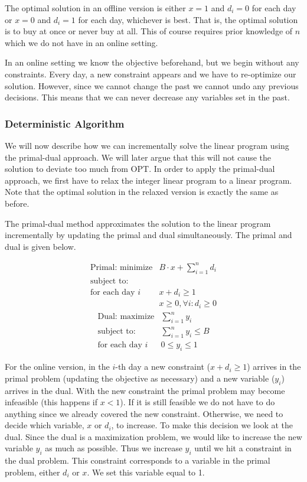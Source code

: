 The optimal solution in an offline version is either $x=1$ and $d_i = 0$ for each day or $x=0$ and $d_i = 1$ for each day, whichever is best.
That is, the optimal solution is to buy at once or never buy at all.
This of course requires prior knowledge of $n$ which we do not have in an online setting.

In an online setting we know the objective beforehand, but we begin without any constraints.
Every day, a new constraint appears and we have to re-optimize our solution.
However, since we cannot change the past we cannot undo any previous decisions.
This means that we can never decrease any variables set in the past.

\subsubsection{Deterministic Algorithm}

We will now describe how we can incrementally solve the linear program using the primal-dual approach.
We will later argue that this will not cause the solution to deviate too much from OPT.
In order to apply the primal-dual approach, we first have to relax the integer linear program to a linear program. Note that the optimal solution in the relaxed version is exactly the same as before.

The primal-dual method approximates the solution to the linear program incrementally by updating the primal and dual simultaneously.
The primal and dual is given below.

\[
	\begin{array}{lr}
	\textrm{Primal: minimize}   & B\cdot x + \sum^n_{i=1} d_i   \\
	\textrm{subject to:} & \\
	\textrm{for each day $i$} & x + d_i  \ge 1  \\
			    & x     \geq 0, \forall i : d_i \ge 0
	\end{array}
\]
\[
	\begin{array}{lr}
	\textrm{Dual: maximize}   & \sum^n_{i=1} y_i   \\
	\textrm{subject to:} & \sum^n_{i=1} y_i \le B \\
	\textrm{for each day $i$} & 0 \le y_i  \le 1
	\end{array}
\]

For the online version, in the $i$-th day a new constraint ($x + d_i  \ge 1$) arrives in the primal problem (updating the objective as necessary) and a new variable ($y_i$) arrives in the dual.
With the new constraint the primal problem may become infeasible (this happens if $x < 1$). 
If it is still feasible we do not have to do anything since we already covered the new constraint. 
Otherwise, we need to decide which variable, $x$ or $d_i$, to increase. 
To make this decision we look at the dual. 
Since the dual is a maximization problem, we would like to increase the new variable $y_i$ as much as possible.
Thus we increase $y_i$ until we hit a constraint in the dual problem.
This constraint corresponds to a variable in the primal problem, either $d_i$ or $x$.
We set this variable equal to 1.

